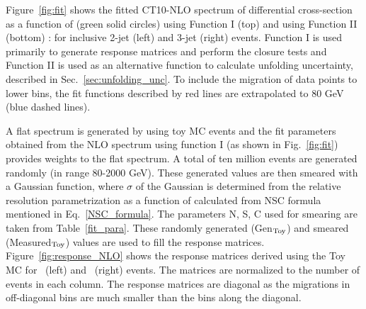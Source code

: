 Figure~\ref{fig:fit} shows the fitted CT10-NLO spectrum of differential cross-section as a function of \httwo (green solid circles) using Function I (top) and using Function II (bottom) : for inclusive 2-jet (left) and 3-jet (right) events. Function I is used primarily to generate response matrices and perform the closure tests and Function II is used as an alternative function to calculate unfolding uncertainty, described in Sec.~\ref{sec:unfolding_unc}. To include the migration of data points to lower bins, the fit functions described by red lines are extrapolated to 80 GeV (blue dashed lines).

A flat \httwo spectrum is generated by using toy MC events and the fit parameters obtained from the NLO spectrum using function I (as shown in Fig.~\ref{fig:fit}) provides weights to the flat spectrum. A total of ten million events are generated randomly (in \httwo range 80-2000 GeV). These generated values are then smeared with a Gaussian function, where $\sigma$ of the Gaussian is determined from the relative resolution parametrization as a function of \httwo calculated from NSC formula mentioned in Eq.~\ref{NSC_formula}. The parameters N, S, C used for smearing are taken from Table~\ref{fit_para}. These randomly generated (Gen$_{\rm Toy}$) and smeared (Measured$_{\rm Toy}$) values are used to fill the response matrices. Figure~\ref{fig:response_NLO} shows the response matrices derived using the Toy MC for \njt~(left) and \njth~(right) events. The matrices are normalized to the number of events in each column. The response matrices are diagonal as the migrations in off-diagonal bins are much smaller than the bins along the diagonal.

